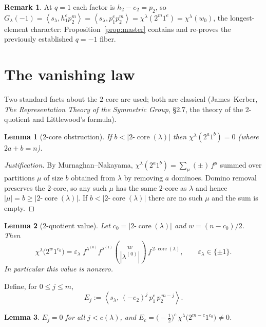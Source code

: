 \documentclass[11pt]{article}
\newtheorem{lemma}{Lemma}
\theoremstyle{definition}
\newtheorem{remark}{Remark}
\DeclareMathOperator{\core}{core}
\newcommand{\la}{\lambda}
\newcommand{\inner}[1]{\left\langle #1 \right\rangle}
\begin{document}
\begin{remark}
At $q=1$ each factor is $h_2-e_2=p_2$, so
$G_\la(-1)=\inner{s_\la,h_1^e p_2^m}=\inner{s_\la,p_1^e p_2^m}=\chi^\la(2^m1^e)
=\chi^\la(w_0)$, the longest-element character: Proposition~\ref{prop:master}
contains and re-proves the previously established $q=-1$ fiber.
\end{remark}

\section{The vanishing law}

Two standard facts about the $2$-core are used; both are classical
(James--Kerber, \emph{The Representation Theory of the Symmetric Group}, \S2.7,
the theory of the $2$-quotient and Littlewood's formula).

\begin{lemma}[$2$-core obstruction]\label{lem:vanish}
If $b<|2\text{-}\core(\la)|$ then $\chi^\la(2^a1^b)=0$ (where $2a+b=n$).
\end{lemma}

\begin{proof}[Justification]
By Murnaghan--Nakayama, $\chi^\la(2^a1^b)=\sum_\mu(\pm)\,f^\mu$ summed over partitions
$\mu$ of size $b$ obtained from $\la$ by removing $a$ dominoes. Domino removal
preserves the $2$-core, so any such $\mu$ has the same $2$-core as $\la$ and hence
$|\mu|=b\ge|2\text{-}\core(\la)|$. If $b<|2\text{-}\core(\la)|$ there are no such
$\mu$ and the sum is empty.
\end{proof}

\begin{lemma}[$2$-quotient value]\label{lem:quotient}
Let $c_0=|2\text{-}\core(\la)|$ and $w=(n-c_0)/2$. Then
\[
  \chi^\la\!\big(2^{w}1^{c_0}\big)
  =\varepsilon_\la\; f^{\la^{(0)}}f^{\la^{(1)}}\binom{w}{|\la^{(0)}|}\,
   f^{\,2\text{-}\core(\la)},\qquad \varepsilon_\la\in\{\pm1\}.
\]
In particular this value is nonzero.
\end{lemma}

Define, for $0\le j\le m$,
\begin{equation}\label{eq:Ej}
  E_j:=\inner{s_\la,\,(-e_2)^{j}\,p_1^{e}\,p_2^{\,m-j}} .
\end{equation}

\begin{lemma}\label{lem:Ej}
$E_j=0$ for all $j<c(\la)$, and
$E_{c}=\big(-\tfrac12\big)^{c}\,\chi^\la\!\big(2^{m-c}1^{c_0}\big)\neq0$.
\end{lemma}
\end{document}
